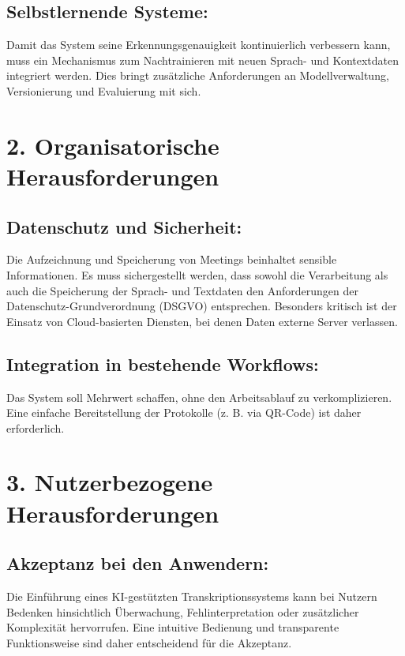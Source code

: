 \subsection{Selbstlernende Systeme:}
Damit das System seine Erkennungsgenauigkeit kontinuierlich verbessern kann, muss ein Mechanismus zum Nachtrainieren mit neuen Sprach- und Kontextdaten integriert werden. Dies bringt zusätzliche Anforderungen an Modellverwaltung, Versionierung und Evaluierung mit sich.

\section{2. Organisatorische Herausforderungen}

\subsection{Datenschutz und Sicherheit:}
Die Aufzeichnung und Speicherung von Meetings beinhaltet sensible Informationen. Es muss sichergestellt werden, dass sowohl die Verarbeitung als auch die Speicherung der Sprach- und Textdaten den Anforderungen der Datenschutz-Grundverordnung (DSGVO) entsprechen. Besonders kritisch ist der Einsatz von Cloud-basierten Diensten, bei denen Daten externe Server verlassen.

\subsection{Integration in bestehende Workflows:}
Das System soll Mehrwert schaffen, ohne den Arbeitsablauf zu verkomplizieren. Eine einfache Bereitstellung der Protokolle (z. B. via QR-Code) ist daher erforderlich. 

\section{3. Nutzerbezogene Herausforderungen}

\subsection{Akzeptanz bei den Anwendern:}
Die Einführung eines KI-gestützten Transkriptionssystems kann bei Nutzern Bedenken hinsichtlich Überwachung, Fehlinterpretation oder zusätzlicher Komplexität hervorrufen. Eine intuitive Bedienung und transparente Funktionsweise sind daher entscheidend für die Akzeptanz.

